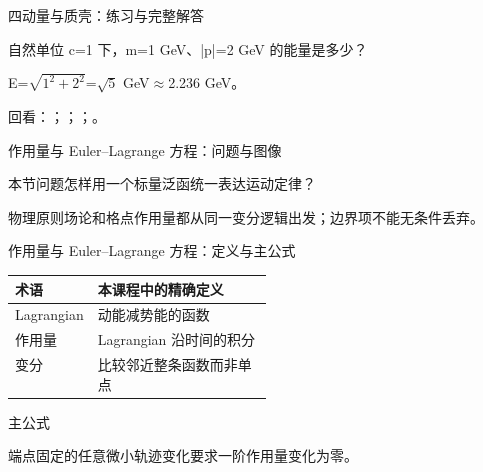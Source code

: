 \begin{frame}[t]{四动量与质壳：练习与完整解答}
\footnotesize
\begin{block}{}自然单位 c=1 下，m=1 GeV、|p|=2 GeV 的能量是多少？\end{block}
\begin{exampleblock}{}E=\ensuremath{\sqrt{1^{2}+2^{2}}}=\ensuremath{\sqrt{5}} GeV\ensuremath{\approx}2.236 GeV。\end{exampleblock}
\vfill
\scriptsize 回看：；；；。
\end{frame}

\begin{frame}[t]{作用量与 Euler--Lagrange 方程：问题与图像}
\footnotesize
\begin{block}{本节问题}怎样用一个标量泛函统一表达运动定律？\end{block}
\begin{block}{物理原则}\quad 场论和格点作用量都从同一变分逻辑出发；边界项不能无条件丢弃。\end{block}
\end{frame}

\begin{frame}[t]{作用量与 Euler--Lagrange 方程：定义与主公式}
\footnotesize\begin{tabularx}{\linewidth}{p{0.30\linewidth}Y}
\toprule 术语 & 本课程中的精确定义\\\midrule
{} Lagrangian & 动能减势能的函数\\
 作用量 & Lagrangian 沿时间的积分\\
 变分 & 比较邻近整条函数而非单点\\
\bottomrule\end{tabularx}\vspace{0.15cm}
\begin{block}{ 主公式}\centering{}\end{block}
端点固定的任意微小轨迹变化要求一阶作用量变化为零。
\end{frame}

